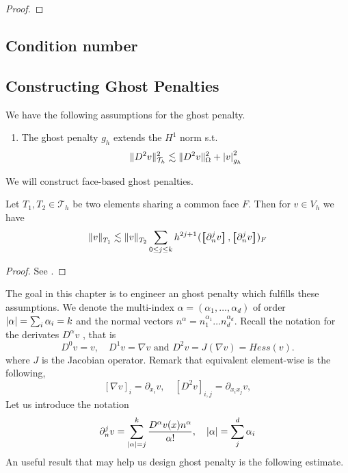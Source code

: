 \begin{proof}
\end{proof}


\newpage
\subsection{Condition number}%
\label{sec:condition_number}


\newpage
\subsection{Constructing Ghost Penalties}%
\label{sec:constructing_ghost_penalties}

We have the following assumptions for the ghost penalty.
\begin{enumerate}[label=\textbf{EP\arabic*}]
    \item\label{as:EP1} The ghost penalty $g_{h}$ extends the $H^{1}$ norm s.t. \[
    \| D^2v \|_{ \mathcal{T} _{h} }^{ 2 }  \lesssim \| D^2 v \|_{ \Omega  }^{  2} + \left\lvert  v  \right\rvert _{g_{h}}^2
    \]
\end{enumerate}


We will construct face-based ghost penalties.

\begin{lemma}
    Let $T_{1},T_{2 } \in  \mathcal{T} _{h}$ be two elements sharing a common face $F$. Then for $v \in V_{h}$  we have \[
    \| v \|_{ T_{1} }^{  }  \lesssim \| v \|_{ T_{2} }^{  } \sum_{0\le j\le k}  {h^{2j +1}}^{} ( \jump{ \partial _{n}^{j} v }, \jump{ \partial ^{j}_{n} v }    )_{F}
    \]

\end{lemma}
\begin{proof}
    See \cite[Lemma 2.19]{gurkan2019stabilized}.
\end{proof}
The goal in this chapter is to engineer an ghost penalty which fulfills these assumptions.
We denote the multi-index $\alpha  = ( \alpha _{1}, \ldots, \alpha _{d})  $ of order $\left\lvert  \alpha   \right\rvert = \sum_{i}^{}  \alpha _{i} = k $   and the normal vectors $n^{\alpha } = n_{1}^{\alpha _{1}} \ldots n_{d}^{\alpha _{d}}$.
Recall the notation for the derivates $D^{\alpha } v$ , that is \[
D ^{0} v  = v, \quad   D ^{1}v  = \nabla v \text{ and }  D ^{2} v  = J(\nabla v) = Hess(v).
\]
where $J$ is the Jacobian operator. Remark that equivalent element-wise is the following, \[
\left[ \nabla v \right] _{i} = \partial_{x_{i}} v, \quad  \left[ D^2 v \right] _{i,j} = \partial_{x_{i}x_{j}} v,
\]
Let us introduce the notation \[
\partial _{n}^{j} v = \sum_{\left\lvert  \alpha   \right\rvert =j }^{k} \frac{D ^{\alpha }v( x) n^{\alpha }}{\alpha !}, \quad \left\lvert  \alpha   \right\rvert = \sum_{j}^{d} \alpha_{i}
\]
An useful result that may help us design ghost penalty is the following estimate.

